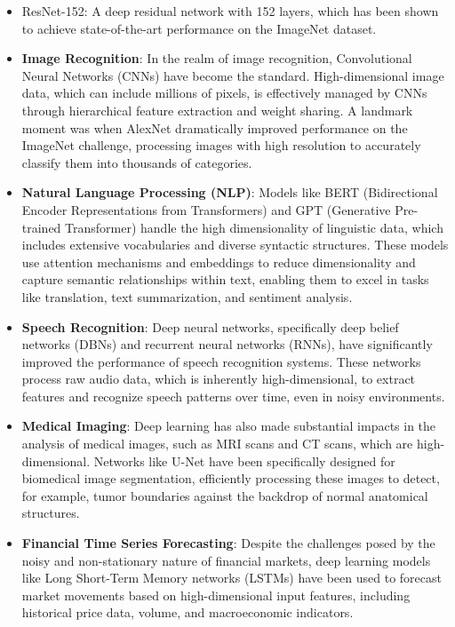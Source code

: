 \documentclass[11pt,a4paper]{article}
\theoremstyle{plain}
\theoremstyle{definition}
\theoremstyle{remark}
\begin{document}
\begin{itemize}
    \item ResNet-152: A deep residual network with 152 layers, which has been shown to achieve state-of-the-art performance on the ImageNet dataset. \cite{ResNet}

    \item \textbf{Image Recognition}: In the realm of image recognition, Convolutional Neural Networks (CNNs) have become the standard. High-dimensional image data, which can include millions of pixels, is effectively managed by CNNs through hierarchical feature extraction and weight sharing. A landmark moment was when AlexNet dramatically improved performance on the ImageNet challenge, processing images with high resolution to accurately classify them into thousands of categories.
    
    \item \textbf{Natural Language Processing (NLP)}: Models like BERT (Bidirectional Encoder Representations from Transformers) and GPT (Generative Pre-trained Transformer) handle the high dimensionality of linguistic data, which includes extensive vocabularies and diverse syntactic structures. These models use attention mechanisms and embeddings to reduce dimensionality and capture semantic relationships within text, enabling them to excel in tasks like translation, text summarization, and sentiment analysis.
    
    \item \textbf{Speech Recognition}: Deep neural networks, specifically deep belief networks (DBNs) and recurrent neural networks (RNNs), have significantly improved the performance of speech recognition systems. These networks process raw audio data, which is inherently high-dimensional, to extract features and recognize speech patterns over time, even in noisy environments.
    
    \item \textbf{Medical Imaging}: Deep learning has also made substantial impacts in the analysis of medical images, such as MRI scans and CT scans, which are high-dimensional. Networks like U-Net have been specifically designed for biomedical image segmentation, efficiently processing these images to detect, for example, tumor boundaries against the backdrop of normal anatomical structures.
    
    \item \textbf{Financial Time Series Forecasting}: Despite the challenges posed by the noisy and non-stationary nature of financial markets, deep learning models like Long Short-Term Memory networks (LSTMs) have been used to forecast market movements based on high-dimensional input features, including historical price data, volume, and macroeconomic indicators.
    

\end{itemize}
\end{document}
